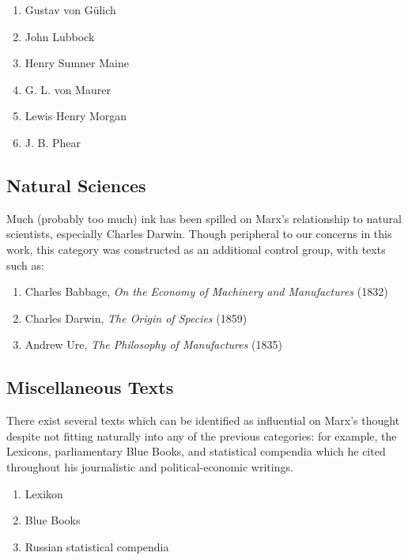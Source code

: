 \begin{enumerate}
    \item Gustav von Gülich
    \item John Lubbock
    \item Henry Sumner Maine
    \item G. L. von Maurer
    \item Lewis Henry Morgan
    \item J. B. Phear
\end{enumerate}

\subsection{Natural Sciences}

Much (probably too much) ink has been spilled on Marx's relationship to natural scientists, especially Charles Darwin. Though peripheral to our concerns in this work, this category was constructed as an additional control group, with texts such as:

\begin{enumerate}
    \item Charles Babbage, \textit{On the Economy of Machinery and Manufactures} (1832)
    \item Charles Darwin, \textit{The Origin of Species} (1859)
    \item Andrew Ure, \textit{The Philosophy of Manufactures} (1835)
\end{enumerate}

\subsection{Miscellaneous Texts}

There exist several texts which can be identified as influential on Marx's thought despite not fitting naturally into any of the previous categories: for example, the Lexicons, parliamentary Blue Books, and statistical compendia which he cited throughout his journalistic and political-economic writings.

\begin{enumerate}
    \item Lexikon
    \item Blue Books
    \item Russian statistical compendia
\end{enumerate}
